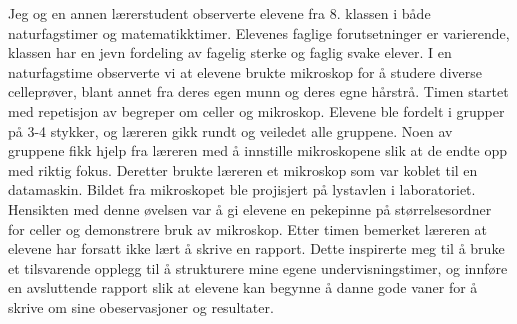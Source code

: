 \documentclass[main.tex]{subfiles}
\begin{document}
Jeg og en annen lærerstudent observerte elevene fra 8. klassen i både naturfagstimer og matematikktimer. 
Elevenes faglige forutsetninger er varierende, klassen har en jevn fordeling av fagelig sterke og faglig 
svake elever. I en naturfagstime observerte vi at elevene brukte mikroskop for å studere diverse celleprøver, 
blant annet fra deres egen munn og deres egne hårstrå. Timen startet med repetisjon av begreper om celler og mikroskop. Elevene 
ble fordelt i grupper på 3-4 stykker, og læreren gikk rundt og veiledet alle gruppene. Noen av gruppene fikk 
hjelp fra læreren med å innstille mikroskopene slik at de endte opp med riktig fokus. Deretter brukte læreren 
et mikroskop som var koblet til en datamaskin. Bildet fra mikroskopet ble projisjert på lystavlen i laboratoriet.
Hensikten med denne øvelsen var å gi elevene en pekepinne på størrelsesordner for celler og demonstrere bruk av mikroskop. 
Etter timen bemerket læreren at elevene har forsatt ikke lært å skrive en rapport. Dette inspirerte meg til å 
bruke et tilsvarende opplegg til å strukturere mine egene undervisningstimer, og innføre en avsluttende rapport 
slik at elevene kan begynne å danne gode vaner for å skrive om sine obeservasjoner og resultater.

\end{document}
